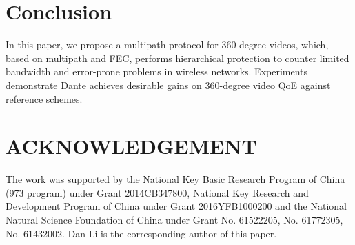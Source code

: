 \documentclass{apnet18}
\begin{document}










\section{Conclusion}
In this paper, we propose a multipath protocol for 360-degree videos, which, based on multipath and FEC, performs hierarchical protection to counter limited bandwidth and error-prone problems in wireless networks. Experiments demonstrate Dante achieves desirable gains on 360-degree video QoE against reference schemes.  

\section*{ACKNOWLEDGEMENT}
The work was supported by the National Key Basic Research Program of China (973 program) under Grant 2014CB347800, National Key Research and Development Program of China under Grant 2016YFB1000200 and the National Natural Science Foundation of China under Grant No. 61522205, No. 61772305, No. 61432002. Dan Li is the corresponding author of this paper.


\begin{small}
	
\end{small}
\label{last-page}
\end{document}
